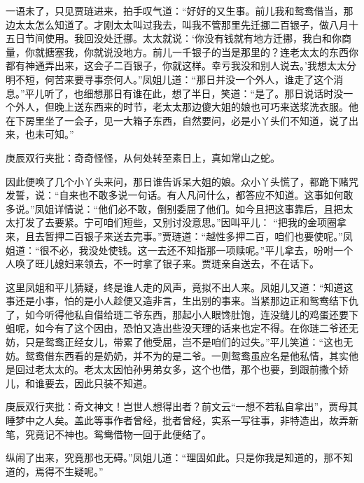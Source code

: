 \begin{parag}


    一语未了，只见贾琏进来，拍手叹气道：“好好的又生事。前儿我和鸳鸯借当，那边太太怎么知道了。才刚太太叫过我去，叫我不管那里先迁挪二百银子，做八月十五日节间使用。我回没处迁挪。太太就说：‘你没有钱就有地方迁挪，我白和你商量，你就搪塞我，你就说没地方。前儿一千银子的当是那里的？连老太太的东西你都有神通弄出来，这会子二百银子，你就这样。幸亏我没和别人说去。’我想太太分明不短，何苦来要寻事奈何人。”凤姐儿道：“那日并没一个外人，谁走了这个消息。”平儿听了，也细想那日有谁在此，想了半日，笑道：“是了。那日说话时没一个外人，但晚上送东西来的时节，老太太那边傻大姐的娘也可巧来送浆洗衣服。他在下房里坐了一会子，见一大箱子东西，自然要问，必是小丫头们不知道，说了出来，也未可知。”\begin{note}庚辰双行夹批：奇奇怪怪，从何处转至素日上，真如常山之蛇。\end{note}因此便唤了几个小丫头来问，那日谁告诉呆大姐的娘。众小丫头慌了，都跪下赌咒发誓，说：“自来也不敢多说一句话。有人凡问什么，都答应不知道。这事如何敢多说。”凤姐详情说：“他们必不敢，倒别委屈了他们。如今且把这事靠后，且把太太打发了去要紧。宁可咱们短些，又别讨没意思。”因叫平儿： “把我的金项圈拿来，且去暂押二百银子来送去完事。”贾琏道：“越性多押二百，咱们也要使呢。”凤姐道：“很不必，我没处使钱。这一去还不知指那一项赎呢。”平儿拿去，吩咐一个人唤了旺儿媳妇来领去，不一时拿了银子来。贾琏亲自送去，不在话下。
\end{parag}


\begin{parag}


    这里凤姐和平儿猜疑，终是谁人走的风声，竟拟不出人来。凤姐儿又道：“知道这事还是小事，怕的是小人趁便又造非言，生出别的事来。当紧那边正和鸳鸯结下仇了，如今听得他私自借给琏二爷东西，那起小人眼馋肚饱，连没缝儿的鸡蛋还要下蛆呢，如今有了这个因由，恐怕又造出些没天理的话来也定不得。在你琏二爷还无妨，只是鸳鸯正经女儿，带累了他受屈，岂不是咱们的过失。”平儿笑道：“这也无妨。鸳鸯借东西看的是奶奶，并不为的是二爷。一则鸳鸯虽应名是他私情，其实他是回过老太太的。老太太因怕孙男弟女多，这个也借，那个也要，到跟前撒个娇儿，和谁要去，因此只装不知道。\begin{note}庚辰双行夹批：奇文神文！岂世人想得出者？前文云“一想不若私自拿出”，贾母其睡梦中之人矣。盖此等事作者曾经，批者曾经，实系一写往事，非特造出，故弄新笔，究竟记不神也。鸳鸯借物一回于此便结了。\end{note}纵闹了出来，究竟那也无碍。”凤姐儿道：“理固如此。只是你我是知道的，那不知道的，焉得不生疑呢。”
\end{parag}


